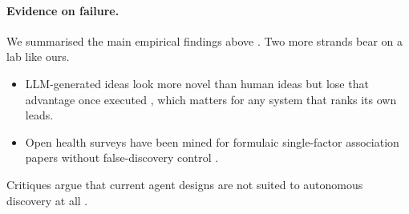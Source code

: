 \documentclass[11pt]{article}
\begin{document}
\paragraph{Evidence on failure.} We summarised the main empirical findings above
\citep{pitfalls2025,kirgis2026,bertran2026many,gao2026nse,forkingpaths2026,badscientist2025,agents4science2025}. Two
more strands bear on a lab like ours.
\begin{itemize}
\item LLM-generated ideas look more novel than human ideas but lose that advantage once executed
\citep{si2025gap}, which matters for any system that ranks its own leads.
\item Open health surveys have been mined for formulaic single-factor association papers without false-discovery
control \citep{suchak2025nhanes}.
\end{itemize}
Critiques argue that current agent designs are not suited to autonomous discovery at all \citep{notbuilt2026}.
\end{document}
